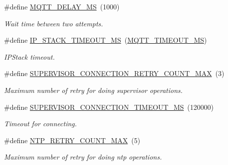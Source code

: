 \begin{DoxyCompactItemize}
\mbox{\label{rmap-config_8h_a4a9d04eab0c57e3143a6d1be60b73fb3}} 
\#define \hyperlink{rmap-config_8h_a4a9d04eab0c57e3143a6d1be60b73fb3}{M\+Q\+T\+T\+\_\+\+D\+E\+L\+A\+Y\+\_\+\+MS}~(1000)
\begin{DoxyCompactList}\small\item\em Wait time between two attempts. \end{DoxyCompactList}\item 
\mbox{\label{rmap-config_8h_a578ee6f26618a9f795fb5828663431f0}} 
\#define \hyperlink{rmap-config_8h_a578ee6f26618a9f795fb5828663431f0}{I\+P\+\_\+\+S\+T\+A\+C\+K\+\_\+\+T\+I\+M\+E\+O\+U\+T\+\_\+\+MS}~(\hyperlink{mqtt__config_8h_abfcc7e625e42a553de9c3132faef282b}{M\+Q\+T\+T\+\_\+\+T\+I\+M\+E\+O\+U\+T\+\_\+\+MS})
\begin{DoxyCompactList}\small\item\em I\+P\+Stack timeout. \end{DoxyCompactList}\item 
\mbox{\label{rmap-config_8h_a8c44e74b589622bd3a3c69bfdc754a3b}} 
\#define \hyperlink{rmap-config_8h_a8c44e74b589622bd3a3c69bfdc754a3b}{S\+U\+P\+E\+R\+V\+I\+S\+O\+R\+\_\+\+C\+O\+N\+N\+E\+C\+T\+I\+O\+N\+\_\+\+R\+E\+T\+R\+Y\+\_\+\+C\+O\+U\+N\+T\+\_\+\+M\+AX}~(3)
\begin{DoxyCompactList}\small\item\em Maximum number of retry for doing supervisor operations. \end{DoxyCompactList}\item 
\mbox{\label{rmap-config_8h_a52ca4538c4f04d08d9b1f35329926912}} 
\#define \hyperlink{rmap-config_8h_a52ca4538c4f04d08d9b1f35329926912}{S\+U\+P\+E\+R\+V\+I\+S\+O\+R\+\_\+\+C\+O\+N\+N\+E\+C\+T\+I\+O\+N\+\_\+\+T\+I\+M\+E\+O\+U\+T\+\_\+\+MS}~(120000)
\begin{DoxyCompactList}\small\item\em Timeout for connecting. \end{DoxyCompactList}\item 
\mbox{\label{rmap-config_8h_a5042473c874b6f184bd4dc197feadca9}} 
\#define \hyperlink{rmap-config_8h_a5042473c874b6f184bd4dc197feadca9}{N\+T\+P\+\_\+\+R\+E\+T\+R\+Y\+\_\+\+C\+O\+U\+N\+T\+\_\+\+M\+AX}~(5)
\begin{DoxyCompactList}\small\item\em Maximum number of retry for doing ntp operations. \end{DoxyCompactList}\item 

\end{DoxyCompactItemize}
